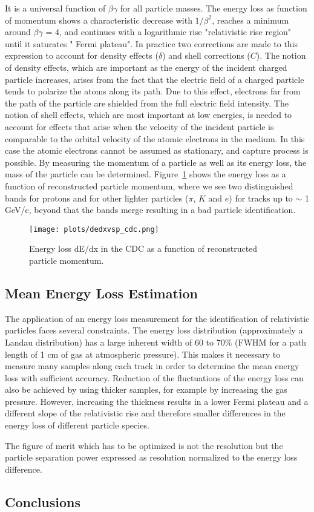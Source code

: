 It is a universal function of $\beta \gamma$ for all particle masses. The energy loss as function of momentum shows a characteristic decrease with $1/\beta^{2}$, reaches a minimum around $\beta \gamma$ = 4, and continues with a logarithmic rise "relativistic rise region" until it saturates " Fermi plateau". In practice two corrections are made to this expression to account for density effects ($\delta$) and shell corrections ($C$). The notion of density effects, which are important as the energy of the incident charged particle increases, arises from the fact that the electric field of a charged particle tends to polarize the atoms along its path. Due to this effect, electrons far from the path of the particle are shielded from the full electric field intensity. The notion of shell effects, which are most important at low energies, is needed to account for effects that arise when the velocity of the incident particle is comparable to the orbital velocity of the atomic electrons in the medium. In this case the atomic electrons cannot be assumed as stationary, and capture process is possible. By measuring the momentum of a particle as well as its energy loss, the mass of the particle can be determined. Figure~\ref{fig.3.1} shows the energy loss as a function of reconstructed particle momentum, where we see two distinguished bands for protons and for other lighter particles ($\pi$, $K$ and $e$) for tracks up to $\sim$ 1 GeV/c, beyond that the bands merge resulting in a bad particle identification.

\begin{figure}[h]
    \centering
    \texttt{[image: plots/dedxvsp\_cdc.png]}
    \caption{\label{fig.3.1}Energy loss dE/dx in the CDC as a function of reconstructed particle momentum.}
\end{figure}

\subsection{Mean Energy Loss Estimation}
The application of an energy loss measurement for the identification of relativistic particles faces several constraints. The energy loss distribution (approximately a Landau distribution) has a large inherent width of 60 to 70$\%$ (FWHM for a path length of 1 cm of gas at atmospheric pressure). This makes it necessary to measure many samples along each track in order to determine the mean energy loss with sufficient accuracy. Reduction of the fluctuations of the energy loss can also be achieved by using thicker samples, for example by increasing the gas pressure. However, increasing the thickness results in a lower Fermi plateau and a different slope of the relativistic rise and therefore smaller differences in the energy loss of different particle species. 

The figure of merit which has to be optimized is not the resolution but the particle separation power expressed as resolution normalized to the energy loss difference.

\subsection{Conclusions}

